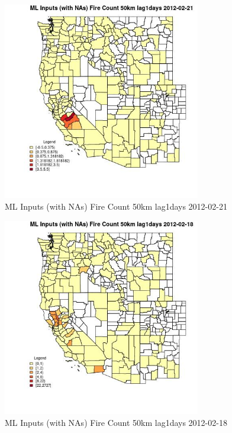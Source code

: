 \begin{figure} 
\centering  
\includegraphics[width=0.77\textwidth]{Code_Outputs/Report_ML_input_PM25_Step4_part_f_de_duplicated_aves_prioritize_24hr_obswNAs_CountyFire_Count_50km_lag1daysMean2012-02-21.jpg} 
\caption{\label{fig:Report_ML_input_PM25_Step4_part_f_de_duplicated_aves_prioritize_24hr_obswNAsCountyFire_Count_50km_lag1daysMean2012-02-21}ML Inputs (with NAs) Fire Count 50km lag1days 2012-02-21} 
\end{figure} 
 

\begin{figure} 
\centering  
\includegraphics[width=0.77\textwidth]{Code_Outputs/Report_ML_input_PM25_Step4_part_f_de_duplicated_aves_prioritize_24hr_obswNAs_CountyFire_Count_50km_lag1daysMean2012-02-18.jpg} 
\caption{\label{fig:Report_ML_input_PM25_Step4_part_f_de_duplicated_aves_prioritize_24hr_obswNAsCountyFire_Count_50km_lag1daysMean2012-02-18}ML Inputs (with NAs) Fire Count 50km lag1days 2012-02-18} 
\end{figure} 
 

